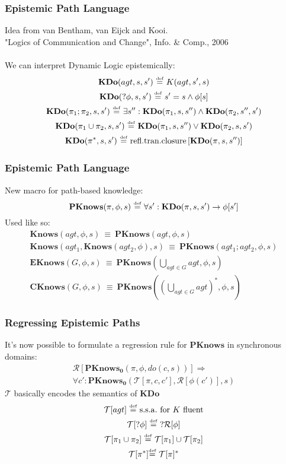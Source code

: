 \documentclass{beamer}
\newcommand{\isdef}{\hbox{$\stackrel{\mbox{\tiny def}}{=}$}}
\newcommand{\Reg}{\mathcal{R}}
\newcommand{\Trn}{\mathcal{T}}
\begin{document}
\begin{frame}
\frametitle{Epistemic Path Language}
Idea from van Bentham, van Eijck and Kooi.\\
"Logics of Communication and Change", Info. \& Comp., 2006
\ \\
\ \\
We can interpret Dynamic Logic epistemically:
\begin{gather*}
\mathbf{KDo}(agt,s,s')\ \isdef\ K(agt,s',s)\\
\mathbf{KDo}(?\phi,s,s')\ \isdef\ s'=s \wedge \phi[s]\\
\mathbf{KDo}(\pi_1;\pi_2,s,s')\ \isdef\ \exists s'': \mathbf{KDo}(\pi_1,s,s'') \wedge \mathbf{KDo}(\pi_2,s'',s')\\
\mathbf{KDo}(\pi_1\cup\pi_2,s,s')\ \isdef\ \mathbf{KDo}(\pi_1,s,s'') \vee \mathbf{KDo}(\pi_2,s,s')\\
\mathbf{KDo}(\pi^*,s,s')\ \isdef\ \mathrm{refl. tran. closure}\left[\mathbf{KDo}(\pi,s,s'')\right]\\
\end{gather*}
\end{frame}

\begin{frame}
\frametitle{Epistemic Path Language}
New macro for path-based knowledge:
\begin{equation*}
\mathbf{PKnows}(\pi,\phi,s)\ \isdef\ \forall s': \mathbf{KDo}(\pi,s,s') \rightarrow \phi[s']
\end{equation*}
Used like so:
\begin{gather*}
\mathbf{Knows}(agt,\phi,s)\ \equiv\ \mathbf{PKnows}(agt,\phi,s)\\
\mathbf{Knows}(agt_1,\mathbf{Knows}(agt_2,\phi),s)\ \equiv\ \mathbf{PKnows}(agt_1 ; agt_2,\phi,s)\\
\mathbf{EKnows}(G,\phi,s)\ \equiv\ \mathbf{PKnows}(\bigcup_{agt \in G}agt,\phi,s)\\
\mathbf{CKnows}(G,\phi,s)\ \equiv\ \mathbf{PKnows}((\bigcup_{agt \in G}agt)^*,\phi,s)
\end{gather*}
\end{frame}

\begin{frame}
\frametitle{Regressing Epistemic Paths}
It's now possible to formulate a regression rule for $\mathbf{PKnows}$ in synchronous domains:
\begin{multline*}
\Reg[\mathbf{PKnows_0}(\pi,\phi,do(c,s))] \Rightarrow \\
 \forall c': \mathbf{PKnows_0}(\Trn[\pi,c,c'],\Reg[\phi(c')],s)
\end{multline*}
$\mathcal{T}$ basically encodes the semantics of $\mathbf{KDo}$
\begin{gather*}
\mathcal{T}[agt]\ \isdef\ \mathrm{s.s.a.\ for}\ K\ \mathrm{fluent} \\
\mathcal{T}[?\phi]\ \isdef\ ?\mathcal{R}[\phi] \\
\mathcal{T}[\pi_1\cup\pi_2]\ \isdef\ \mathcal{T}[\pi_1]\cup\mathcal{T}[\pi_2] \\
\mathcal{T}[\pi^*] \isdef\ \mathcal{T}[\pi]^*
\end{gather*}
\end{frame}
\end{document}
